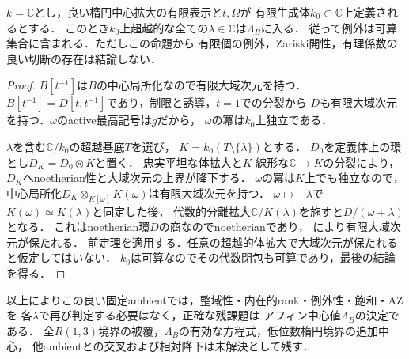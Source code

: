 \begin{proposition}[定義体上超越的な全切断のadmissibility]
\label{prop:r13-all-transcendental-cuts}
$k=\mathbb C$とし，良い楕円中心拡大の有限表示と$t,\Omega$が
有限生成体$k_0\subset\mathbb C$上定義されるとする．
このとき$k_0$上超越的な全ての$\lambda\in\mathbb C$は$\Lambda_B$に入る．
従って例外は可算集合に含まれる．ただしこの命題から
有限個の例外，Zariski開性，有理係数の良い切断の存在は結論しない．
\end{proposition}
\begin{proof}
$B[t^{-1}]$は$B$の中心局所化なので有限大域次元を持つ．
$B[t^{-1}]=D[t,t^{-1}]$であり，制限と誘導，$t=1$での分裂から
$D$も有限大域次元を持つ．$\omega$のactive最高記号は$g$だから，
$\omega$の冪は$k_0$上独立である．

$\lambda$を含む$\mathbb C/k_0$の超越基底$T$を選び，
$K=k_0(T\setminus\{\lambda\})$とする．
$D_0$を定義体上の環とし$D_K=D_0\otimes K$と置く．
忠実平坦な体拡大と$K$-線形な$\mathbb C\to K$の分裂により，
$D_K$へnoetherian性と大域次元の上界が降下する．
$\omega$の冪は$K$上でも独立なので，
中心局所化$D_K\otimes_{K[\omega]}K(\omega)$は有限大域次元を持つ．
$\omega\mapsto-\lambda$で$K(\omega)\simeq K(\lambda)$と同定した後，
代数的分離拡大$\mathbb C/K(\lambda)$を施すと$D/(\omega+\lambda)$となる．
これはnoetherian環$D$の商なのでnoetherianであり，
\cite[Lemmas 3.2, 3.3]{RSV}により有限大域次元が保たれる．
前定理を適用する．任意の超越的体拡大で大域次元が保たれると仮定してはいない．
$k_0$は可算なのでその代数閉包も可算であり，最後の結論を得る．
\end{proof}

以上によりこの良い固定ambientでは，整域性・内在的rank・例外性・飽和・AZを
各$\lambda$で再び判定する必要はなく，正確な残課題は
アフィン中心値$\Lambda_B$の決定である．
全$R(1,3)$境界の被覆，$\Lambda_B$の有効な方程式，低位数楕円境界の追加中心，
他ambientとの交叉および相対降下は未解決として残す．

